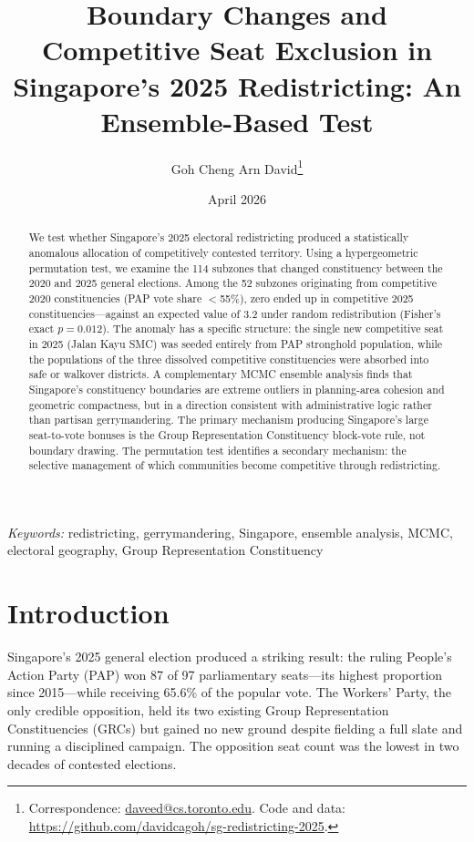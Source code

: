 \documentclass[12pt]{article}
\title{\textbf{Boundary Changes and Competitive Seat Exclusion in\\
Singapore's 2025 Redistricting: An Ensemble-Based Test}}
\author{Goh Cheng Arn David\thanks{Correspondence: \href{mailto:daveed@cs.toronto.edu}{daveed@cs.toronto.edu}.
Code and data: \url{https://github.com/davidcagoh/sg-redistricting-2025}.}}
\date{April 2026}
\begin{document}
\maketitle
\thispagestyle{empty}

\begin{abstract}
We test whether Singapore's 2025 electoral redistricting produced a statistically anomalous
allocation of competitively contested territory. Using a hypergeometric permutation test, we
examine the 114 subzones that changed constituency between the 2020 and 2025 general elections.
Among the 52 subzones originating from competitive 2020 constituencies (PAP vote share $<$55\%),
zero ended up in competitive 2025 constituencies---against an expected value of 3.2 under random
redistribution (Fisher's exact $p = 0.012$). The anomaly has a specific structure: the single new
competitive seat in 2025 (Jalan Kayu SMC) was seeded entirely from PAP stronghold population,
while the populations of the three dissolved competitive constituencies were absorbed into safe or
walkover districts. A complementary MCMC ensemble analysis finds that Singapore's constituency
boundaries are extreme outliers in planning-area cohesion and geometric compactness, but in a
direction consistent with administrative logic rather than partisan gerrymandering. The primary
mechanism producing Singapore's large seat-to-vote bonuses is the Group Representation
Constituency block-vote rule, not boundary drawing. The permutation test identifies a secondary
mechanism: the selective management of which communities become competitive through redistricting.
\end{abstract}

\vspace{1em}
\noindent\textit{Keywords:} redistricting, gerrymandering, Singapore, ensemble analysis, MCMC,
electoral geography, Group Representation Constituency

\clearpage

\section{Introduction}

Singapore's 2025 general election produced a striking result: the ruling People's Action Party
(PAP) won 87 of 97 parliamentary seats---its highest proportion since 2015---while receiving 65.6\%
of the popular vote. The Workers' Party, the only credible opposition, held its two existing Group
Representation Constituencies (GRCs) but gained no new ground despite fielding a full slate and
running a disciplined campaign. The opposition seat count was the lowest in two decades of
contested elections.
\end{document}
